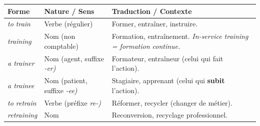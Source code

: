 \documentclass[11pt]{article}
\newcommand{\eng}[1]{\ifmmode\text{\textit{#1}}\else\begingroup\selectlanguage{english}\itshape #1\endgroup\fi}
\begin{document}
\begin{center}
\begin{tabularx}{\linewidth}{|X|X|X|}
\hline
\rowcolor{popblueL} \textbf{Forme} & \textbf{Nature / Sens} & \textbf{Traduction / Contexte} \\
\hline
\eng{to train} & Verbe (régulier) & Former, entraîner, instruire. \\
\hline
\eng{training} & Nom (non comptable) & Formation, entraînement. \eng{In-service training} = formation continue. \\
\hline
\eng{a trainer} & Nom (agent, suffixe \eng{-er}) & Formateur, entraîneur (celui qui fait l'action). \\
\hline
\eng{a trainee} & Nom (patient, suffixe \eng{-ee}) & Stagiaire, apprenant (celui qui \textbf{subit} l'action). \\
\hline
\eng{to retrain} & Verbe (préfixe \eng{re-}) & Réformer, recycler (changer de métier). \\
\hline
\eng{retraining} & Nom & Reconversion, recyclage professionnel. \\
\hline
\end{tabularx}
\end{center}
\end{document}
